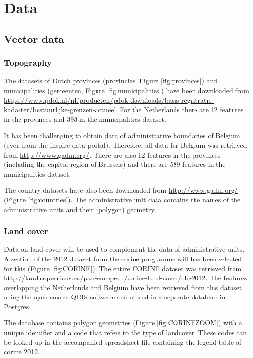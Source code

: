 
\chapter{Data}
\label{chap:data}

\section{Vector data}
\subsection{Topography}
\begin{sloppypar}
	The datasets of Dutch provinces (provincies, Figure \ref{fig:provinces}) and municipalities (gemeenten, Figure \ref{fig:municipalities}) have been downloaded from \url{https://www.pdok.nl/nl/producten/pdok-downloads/basis-registratie-kadaster/bestuurlijke-grenzen-actueel}. For the Netherlands there are 12 features in the provinces and 393 in the municipalities dataset. 
	
	It has been challenging to obtain data of administrative boundaries of Belgium (even from the \ac{inspire} data portal). Therefore, all data for Belgium was retrieved from \url{http://www.gadm.org/}. There are also 12 features in the provinces (including the capitol region of Brussels) and there are 589 features in the municipalities dataset.  
	
	The country datasets have also been downloaded from \url{http://www.gadm.org/} (Figure \ref{fig:countries}). The administrative unit data contains the names of the administrative units and their (polygon) geometry. 
\end{sloppypar}

\subsection{Land cover}
\begin{sloppypar}
	Data on land cover will be used to complement the data of administrative units. A section of the 2012 dataset from the \ac{corine} programme will has been selected for this (Figure \ref{fig:CORINE}). The entire CORINE dataset was retrieved from \url{http://land.copernicus.eu/pan-european/corine-land-cover/clc-2012}. The features overlapping the Netherlands and Belgium have been retrieved from this dataset using the open source QGIS software and stored in a separate database in Postgres. 
	
	The database contains polygon geometries (Figure \ref{fig:CORINEZOOM}) with a unique identifier and a code that refers to the type of landcover. These codes can be looked up in the accompanied spreadsheet file containing the legend table of \ac{corine} 2012.  	
\end{sloppypar}

